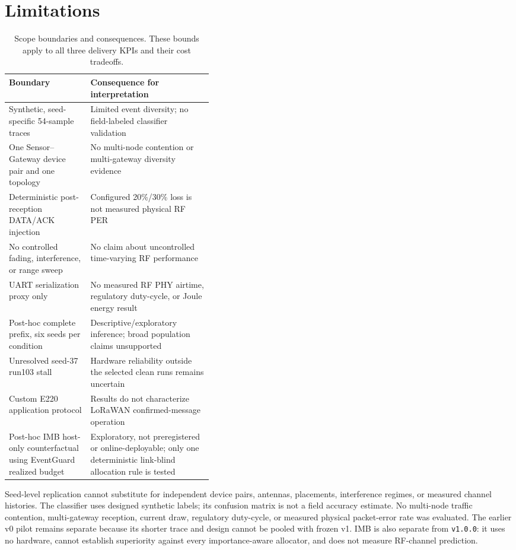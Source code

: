 \documentclass[11pt]{article}
\begin{document}
\section{Limitations}\label{sec:limitations}

\begin{table}[t]
\centering
\small
\caption{Scope boundaries and consequences. These bounds apply to all three delivery KPIs and their cost tradeoffs.}
\label{tab:limitations}
\begin{tabularx}{\linewidth}{@{}>{\raggedright\arraybackslash}p{0.40\linewidth}>{\raggedright\arraybackslash}X@{}}
\toprule
Boundary & Consequence for interpretation \\
\midrule
Synthetic, seed-specific 54-sample traces & Limited event diversity; no field-labeled classifier validation \\
One Sensor--Gateway device pair and one topology & No multi-node contention or multi-gateway diversity evidence \\
Deterministic post-reception DATA/ACK injection & Configured 20\%/30\% loss is not measured physical RF PER \\
No controlled fading, interference, or range sweep & No claim about uncontrolled time-varying RF performance \\
UART serialization proxy only & No measured RF PHY airtime, regulatory duty-cycle, or Joule energy result \\
Post-hoc complete prefix, six seeds per condition & Descriptive/exploratory inference; broad population claims unsupported \\
Unresolved seed-37 run103 stall & Hardware reliability outside the selected clean runs remains uncertain \\
Custom E220 application protocol & Results do not characterize LoRaWAN confirmed-message operation \\
Post-hoc IMB host-only counterfactual using EventGuard realized budget & Exploratory, not preregistered or online-deployable; only one deterministic link-blind allocation rule is tested \\
\bottomrule
\end{tabularx}
\end{table}

Seed-level replication cannot substitute for independent device pairs, antennas, placements, interference regimes, or measured channel histories. The classifier uses designed synthetic labels; its confusion matrix is not a field accuracy estimate. No multi-node traffic contention, multi-gateway reception, current draw, regulatory duty-cycle, or measured physical packet-error rate was evaluated. The earlier v0 pilot remains separate because its shorter trace and design cannot be pooled with frozen v1. IMB is also separate from \texttt{v1.0.0}: it uses no hardware, cannot establish superiority against every importance-aware allocator, and does not measure RF-channel prediction.
\end{document}

